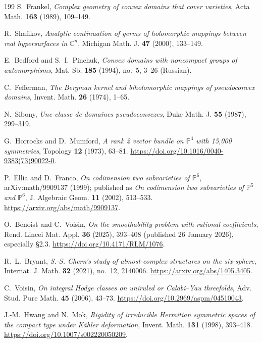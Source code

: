 \documentclass[11pt,reqno]{amsart}
\theoremstyle{definition}
\theoremstyle{remark}
\begin{document}
\begin{thebibliography}{199}
 S.~Frankel, \emph{Complex geometry of convex domains that cover varieties}, Acta Math. \textbf{163} (1989), 109--149.

 R.~Shafikov, \emph{Analytic continuation of germs of holomorphic mappings between real hypersurfaces in $\mathbb C^n$}, Michigan Math. J. \textbf{47} (2000), 133--149.

 E.~Bedford and S.~I.~Pinchuk, \emph{Convex domains with noncompact groups of automorphisms}, Mat. Sb. \textbf{185} (1994), no.~5, 3--26 (Russian).

 C.~Fefferman, \emph{The Bergman kernel and biholomorphic mappings of pseudoconvex domains}, Invent. Math. \textbf{26} (1974), 1--65.

 N.~Sibony, \emph{Une classe de domaines pseudoconvexes}, Duke Math. J. \textbf{55} (1987), 299--319.

 G.~Horrocks and D.~Mumford, \emph{A rank 2 vector bundle on $\mathbb P^4$ with 15,000 symmetries}, Topology \textbf{12} (1973), 63--81. \url{https://doi.org/10.1016/0040-9383(73)90022-0}.

 P.~Ellia and D.~Franco, \emph{On codimension two subvarieties of $\mathbb P^6$}, arXiv:math/9909137 (1999); published as \emph{On codimension two subvarieties of $\mathbb P^5$ and $\mathbb P^6$}, J. Algebraic Geom. \textbf{11} (2002), 513--533. \url{https://arxiv.org/abs/math/9909137}.

 O.~Benoist and C.~Voisin, \emph{On the smoothability problem with rational coefficients}, Rend. Lincei Mat. Appl. \textbf{36} (2025), 393--408 (published 26 January 2026), especially \S2.3. \url{https://doi.org/10.4171/RLM/1076}.

 R.~L.~Bryant, \emph{S.-S. Chern's study of almost-complex structures on the six-sphere}, Internat. J. Math. \textbf{32} (2021), no.~12, 2140006. \url{https://arxiv.org/abs/1405.3405}.

 C.~Voisin, \emph{On integral Hodge classes on uniruled or Calabi--Yau threefolds}, Adv. Stud. Pure Math. \textbf{45} (2006), 43--73. \url{https://doi.org/10.2969/aspm/04510043}.

 J.-M.~Hwang and N.~Mok, \emph{Rigidity of irreducible Hermitian symmetric spaces of the compact type under K\"ahler deformation}, Invent. Math. \textbf{131} (1998), 393--418. \url{https://doi.org/10.1007/s002220050209}.


\end{thebibliography}
\end{document}
